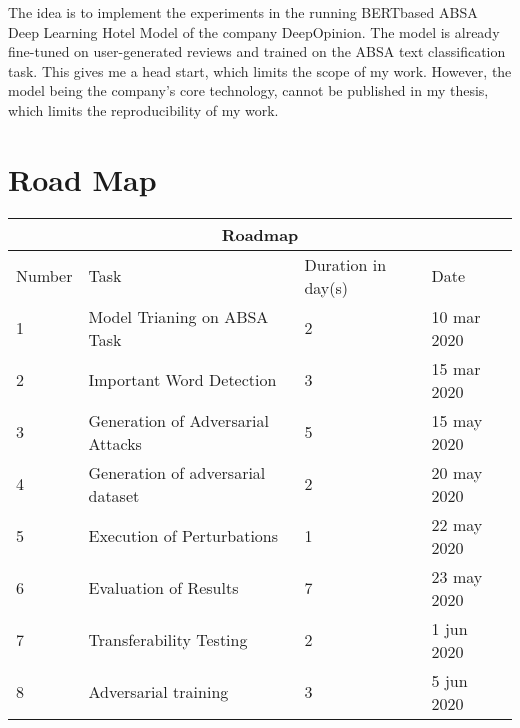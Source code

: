 The idea is to implement the experiments in the running BERTbased ABSA Deep Learning Hotel Model of the company DeepOpinion. The model is already fine-tuned on user-generated reviews and trained on the ABSA text classification task. This gives me a head start, which limits the scope of my work. However, the model being the company's core technology, cannot be published in my thesis, which limits the reproducibility of my work.



\section{Road Map}

\begin{tabular}{ |p{1.5cm}||p{7cm}|p{2cm}|p{3cm}|  }
 \hline
 \multicolumn{4}{|c|}{Roadmap} \\
 \hline
Number & Task & Duration in day(s) & Date\\
 \hline
 1 & Model Trianing on ABSA Task & 2 & 10 mar 2020 \\
 2 & Important Word Detection & 3 & 15 mar 2020\\
 3 & Generation of Adversarial Attacks & 5 & 15 may 2020\\
 4 & Generation of adversarial dataset & 2 & 20 may 2020\\
 5 & Execution of Perturbations & 1 & 22 may 2020\\
 6 & Evaluation of Results & 7 & 23 may 2020\\
 7 & Transferability Testing & 2 & 1 jun 2020\\
 8 & Adversarial training & 3 & 5 jun 2020 \\
 \hline
\end{tabular}



